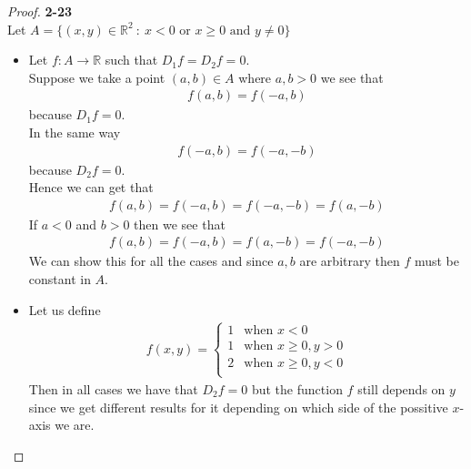 \documentclass[11pt]{article}
\newcommand{\R}{\mathbb{R}}
\theoremstyle{definition}
\begin{document}
\cleardoublepage
\begin{proof}{\textbf{2-23}}\\
Let $A = \{(x,y)\in\R^2~:~x<0 \text{ or } x\geq 0 \text{ and }y\neq 0\}$
\begin{itemize}
\item [(a)] Let $f:A \to \R$ such that $D_1f = D_2f = 0$.
\\
Suppose we take a point $(a,b)\in A$ where $a, b> 0$ we see that
\begin{align*}
    f(a,b) = f(-a,b)
\end{align*}
because $D_1f = 0$.\\
In the same way
\begin{align*}
    f(-a,b) = f(-a,-b)
\end{align*}
because $D_2f = 0$.\\
Hence we can get that
\begin{align*}
    f(a,b) = f(-a,b) = f(-a,-b) = f(a,-b)
\end{align*}
If $a< 0$ and $b> 0$ then we see that
\begin{align*}
    f(a,b) = f(-a,b) = f(a,-b) = f(-a,-b)
\end{align*}
We can show this for all the cases and since $a,b$ are arbitrary then $f$ must
be constant in $A$.
\item [(b)] Let us define 
\begin{align*}
    f(x,y) = \begin{cases}
        1 & \text{when } x < 0\\
        1 & \text{when } x \geq 0, y > 0\\
        2 & \text{when } x \geq 0, y < 0\\
    \end{cases}
\end{align*}
Then in all cases we have that $D_2f = 0$ but the function $f$ still depends
on $y$ since we get different results for it depending on which side of the
possitive $x$-axis we are.
\end{itemize}
\end{proof}
\end{document}
